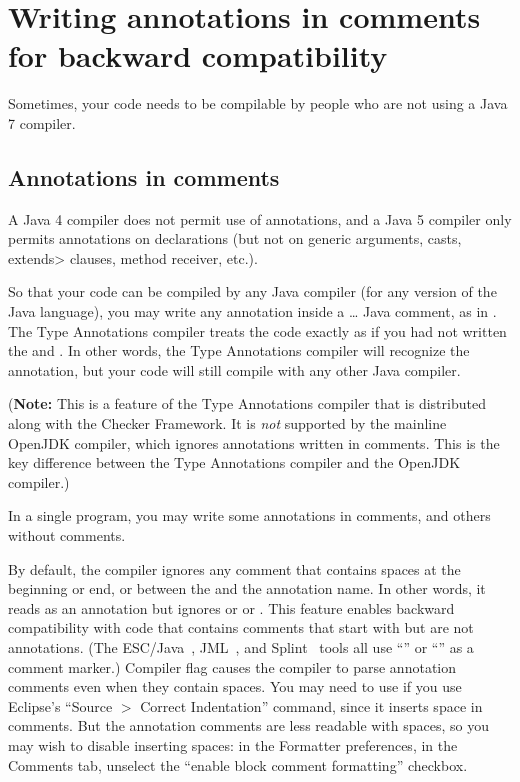 \section{Writing annotations in comments for backward compatibility\label{annotations-in-comments}}

Sometimes, your code needs to be compilable by people who are not
using a Java 7 compiler.


\subsection{Annotations in comments}

A Java 4 compiler does not permit use of
annotations, and a Java 5 compiler only permits annotations on
declarations (but not on generic arguments, casts, \<extends> clauses, method receiver, etc.).

So that your code can be compiled by any Java compiler (for any version of
the Java language), you may write any annotation inside a
\code{/*}\ldots\code{*/} Java comment, as in .
The Type Annotations compiler treats the code exactly as if you had not written the
\code{/*} and \code{*/}.
In other words, the Type Annotations compiler will recognize the
annotation, but your code will still compile with any other Java compiler.

(\textbf{Note:} This is a feature of the Type Annotations compiler that is
distributed along with the Checker Framework.  It is \emph{not} supported by the
mainline OpenJDK compiler, which ignores annotations written in
comments.  This is the key difference between the Type Annotations
compiler and the OpenJDK compiler.)

In a single program, you may write some annotations in comments, and others
without comments.

By default, the compiler ignores any comment that contains spaces at the
beginning or end, or between the  and the annotation name.  
In other words, it reads  as an annotation but ignores
 or  or .
This
feature enables backward compatibility with code that contains comments
that start with  but are not annotations.  (The
ESC/Java~\cite{FlanaganLLNSS02}, JML~\cite{LeavensBR2006:JML}, and
Splint~\cite{Evans96} tools all use ``'' or ``'' as a
comment marker.)
Compiler flag
 causes the compiler to parse annotation comments
even when they contain spaces.  You may need to use
 if you use Eclipse's ``Source $>$ Correct
Indentation'' command, since it inserts space in comments.  But the
annotation comments are less readable with spaces, so you may wish to disable
inserting spaces:  in the Formatter preferences, in the Comments tab,
unselect the ``enable block comment formatting'' checkbox.


